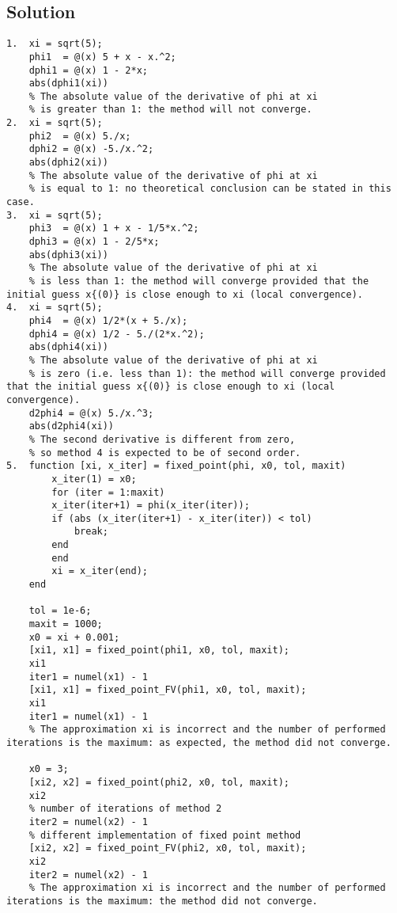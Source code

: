 \documentclass[12pt, a4paper]{report}
\begin{document}
    \subsection*{Solution}
        \begin{lstlisting}[style=Matlab]
1.  xi = sqrt(5);
    phi1  = @(x) 5 + x - x.^2;
    dphi1 = @(x) 1 - 2*x;
    abs(dphi1(xi))
    % The absolute value of the derivative of phi at xi
    % is greater than 1: the method will not converge.
2.  xi = sqrt(5);
    phi2  = @(x) 5./x;
    dphi2 = @(x) -5./x.^2;
    abs(dphi2(xi))
    % The absolute value of the derivative of phi at xi
    % is equal to 1: no theoretical conclusion can be stated in this case.
3.  xi = sqrt(5);
    phi3  = @(x) 1 + x - 1/5*x.^2;
    dphi3 = @(x) 1 - 2/5*x;
    abs(dphi3(xi))
    % The absolute value of the derivative of phi at xi
    % is less than 1: the method will converge provided that the initial guess x{(0)} is close enough to xi (local convergence).
4.  xi = sqrt(5);
    phi4  = @(x) 1/2*(x + 5./x);
    dphi4 = @(x) 1/2 - 5./(2*x.^2);
    abs(dphi4(xi))
    % The absolute value of the derivative of phi at xi
    % is zero (i.e. less than 1): the method will converge provided that the initial guess x{(0)} is close enough to xi (local convergence).
    d2phi4 = @(x) 5./x.^3;
    abs(d2phi4(xi))
    % The second derivative is different from zero,
    % so method 4 is expected to be of second order.
5.  function [xi, x_iter] = fixed_point(phi, x0, tol, maxit)
        x_iter(1) = x0;
        for (iter = 1:maxit)
        x_iter(iter+1) = phi(x_iter(iter));
        if (abs (x_iter(iter+1) - x_iter(iter)) < tol)
            break;
        end
        end
        xi = x_iter(end);
    end

    tol = 1e-6;
    maxit = 1000;
    x0 = xi + 0.001;
    [xi1, x1] = fixed_point(phi1, x0, tol, maxit);
    xi1
    iter1 = numel(x1) - 1
    [xi1, x1] = fixed_point_FV(phi1, x0, tol, maxit);
    xi1
    iter1 = numel(x1) - 1
    % The approximation xi is incorrect and the number of performed iterations is the maximum: as expected, the method did not converge.

    x0 = 3;
    [xi2, x2] = fixed_point(phi2, x0, tol, maxit);
    xi2
    % number of iterations of method 2
    iter2 = numel(x2) - 1
    % different implementation of fixed point method
    [xi2, x2] = fixed_point_FV(phi2, x0, tol, maxit);
    xi2
    iter2 = numel(x2) - 1
    % The approximation xi is incorrect and the number of performed iterations is the maximum: the method did not converge.


\end{lstlisting}
\end{document}
